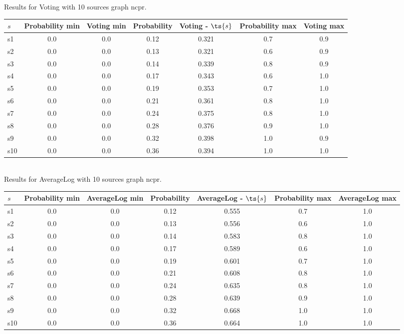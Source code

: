 \documentclass{article}
\begin{document}
\noindent Results for Voting with 10 sources graph ncpr.

\noindent\begin{tabular}{|l|c|c|c|c|c|c|}
\hline
$s$& Probability min & Voting min & Probability & Voting - $\ts{s}$ & Probability max & Voting max\\
\hline
s1 &0.0 & 0.0 & 0.12 & 0.321 & 0.7 & 0.9\\
\hline
s2 &0.0 & 0.0 & 0.13 & 0.321 & 0.6 & 0.9\\
\hline
s3 &0.0 & 0.0 & 0.14 & 0.339 & 0.8 & 0.9\\
\hline
s4 &0.0 & 0.0 & 0.17 & 0.343 & 0.6 & 1.0\\
\hline
s5 &0.0 & 0.0 & 0.19 & 0.353 & 0.7 & 1.0\\
\hline
s6 &0.0 & 0.0 & 0.21 & 0.361 & 0.8 & 1.0\\
\hline
s7 &0.0 & 0.0 & 0.24 & 0.375 & 0.8 & 1.0\\
\hline
s8 &0.0 & 0.0 & 0.28 & 0.376 & 0.9 & 1.0\\
\hline
s9 &0.0 & 0.0 & 0.32 & 0.398 & 1.0 & 0.9\\
\hline
s10 &0.0 & 0.0 & 0.36 & 0.394 & 1.0 & 1.0\\
\hline
\end{tabular}\\

\noindent Results for AverageLog with 10 sources graph ncpr.

\noindent\begin{tabular}{|l|c|c|c|c|c|c|}
\hline
$s$& Probability min & AverageLog min & Probability & AverageLog - $\ts{s}$ & Probability max & AverageLog max\\
\hline
s1 &0.0 & 0.0 & 0.12 & 0.555 & 0.7 & 1.0\\
\hline
s2 &0.0 & 0.0 & 0.13 & 0.556 & 0.6 & 1.0\\
\hline
s3 &0.0 & 0.0 & 0.14 & 0.583 & 0.8 & 1.0\\
\hline
s4 &0.0 & 0.0 & 0.17 & 0.589 & 0.6 & 1.0\\
\hline
s5 &0.0 & 0.0 & 0.19 & 0.601 & 0.7 & 1.0\\
\hline
s6 &0.0 & 0.0 & 0.21 & 0.608 & 0.8 & 1.0\\
\hline
s7 &0.0 & 0.0 & 0.24 & 0.635 & 0.8 & 1.0\\
\hline
s8 &0.0 & 0.0 & 0.28 & 0.639 & 0.9 & 1.0\\
\hline
s9 &0.0 & 0.0 & 0.32 & 0.668 & 1.0 & 1.0\\
\hline
s10 &0.0 & 0.0 & 0.36 & 0.664 & 1.0 & 1.0\\
\hline
\end{tabular}\\
\end{document}
